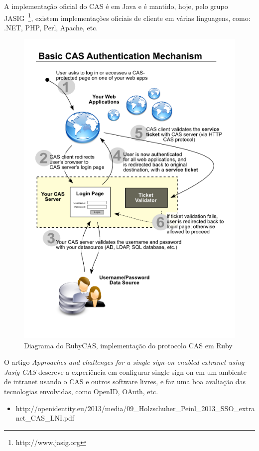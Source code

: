 \documentclass[11pt]{article}
\begin{document}
A implementação oficial do CAS é em Java e é mantido, hoje, pelo grupo
JASIG~\footnote{http://www.jasig.org}, existem implementações oficiais de
cliente em várias linguagens, como: .NET, PHP, Perl, Apache, etc.

\begin{figure}[h]
\center
\includegraphics[scale=0.4]{sso-rubycas.png}
\caption{Diagrama do RubyCAS, implementação do protocolo CAS em Ruby}
\label{fig:sso-rubycas}
\end{figure}

O artigo {\it Approaches and challenges for a single sign-on enabled extranet
using Jasig CAS} descreve a experiência em configurar single sign-on em um
ambiente de intranet usando o CAS e outros software livres, e faz uma boa
avaliação das tecnologias envolvidas, como OpenID, OAuth, etc.

\begin{itemize}
  \item{http://openidentity.eu/2013/media/09\_Holzschuher\_Peinl\_2013\_SSO\_extranet\_CAS\_LNI.pdf}
\end{itemize}
\end{document}
